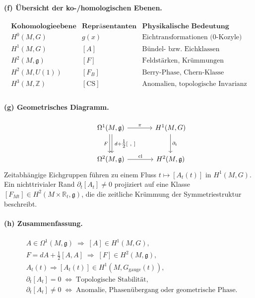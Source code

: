 \documentclass[10pt, letterpaper]{article}
\begin{document}
\paragraph{(f) Übersicht der ko-/homologischen Ebenen.}
\[
\boxed{
\begin{array}{lll}
\textbf{Kohomologieebene} & \textbf{Repräsentanten} & \textbf{Physikalische Bedeutung}\\[3pt]
\hline
H^0(M,G) & g(x) & \text{Eichtransformationen (0-Kozyle)}\\[3pt]
H^1(M,G) & [A] & \text{Bündel- bzw. Eichklassen}\\[3pt]
H^2(M,\mathfrak g) & [F] & \text{Feldstärken, Krümmungen}\\[3pt]
H^2(M,U(1)) & [F_B] & \text{Berry-Phase, Chern-Klasse}\\[3pt]
H^3(M,\mathbb Z) & [\mathrm{CS}] & \text{Anomalien, topologische Invarianz}\\[3pt]
\end{array}
}
\]

\paragraph{(g) Geometrisches Diagramm.}
\[
\begin{tikzcd}[row sep=large, column sep=large]
  & \Omega^1(M,\mathfrak g)
      \arrow[d, shift left=.4ex, "{\,d+\tfrac12[\ ,\ ]\,}"]
      \arrow[d, shift right=.4ex, swap, "{F}"]
      \arrow[r, "{\pi}"]
    & H^1(M,G)
      \arrow[d, "{\partial_t}"] \\
  & \Omega^2(M,\mathfrak g)
      \arrow[r, "{\mathrm{cl}}"]
    & H^2(M,\mathfrak g)
\end{tikzcd}
\]
Zeitabhängige Eichgruppen führen zu einem Fluss
$t\mapsto[A_t(t)]$ in $H^1(M,G)$.
Ein nichttrivialer Rand $\partial_t[A_t]\neq0$
projiziert auf eine Klasse $[F_{Mt}]\in H^2(M\times\mathbb R_t,\mathfrak g)$,
die die zeitliche Krümmung der Symmetriestruktur beschreibt.

\paragraph{(h) Zusammenfassung.}
\[
\boxed{
\begin{aligned}
&A\in\Omega^1(M,\mathfrak g)\;\Rightarrow\;[A]\in H^1(M,G),\\[3pt]
&F=dA+\tfrac12[A,A]\;\Rightarrow\;[F]\in H^2(M,\mathfrak g),\\[3pt]
&A_t(t)\Rightarrow [A_t(t)]\in H^1(M,G_\mathrm{gauge}(t)),\\[3pt]
&\partial_t [A_t]=0 \;\Leftrightarrow\;\text{Topologische Stabilität},\\[3pt]
&\partial_t [A_t]\neq0 \;\Leftrightarrow\;\text{Anomalie, Phasenübergang oder geometrische Phase.}
\end{aligned}
}
\]
\end{document}
